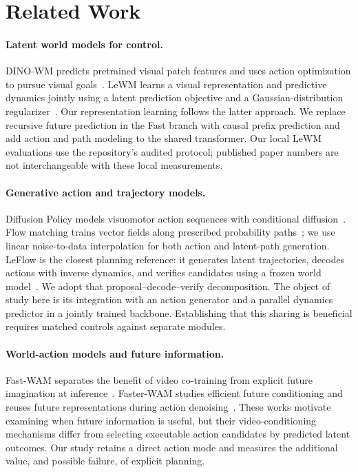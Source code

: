 \section{Related Work}
\label{sec:related}

\paragraph{Latent world models for control.}
DINO-WM predicts pretrained visual patch features and uses action optimization to pursue visual goals~\cite{zhou2024dinowm}. LeWM learns a visual representation and predictive dynamics jointly using a latent prediction objective and a Gaussian-distribution regularizer~\cite{maes2026lewm}. Our representation learning follows the latter approach. We replace recursive future prediction in the Fast branch with causal prefix prediction and add action and path modeling to the shared transformer. Our local LeWM evaluations use the repository's audited protocol; published paper numbers are not interchangeable with these local measurements.

\paragraph{Generative action and trajectory models.}
Diffusion Policy models visuomotor action sequences with conditional diffusion~\cite{chi2023diffusion}. Flow matching trains vector fields along prescribed probability paths~\cite{lipman2022flow}; we use linear noise-to-data interpolation for both action and latent-path generation. LeFlow is the closest planning reference: it generates latent trajectories, decodes actions with inverse dynamics, and verifies candidates using a frozen world model~\cite{huang2026leflow}. We adopt that proposal--decode--verify decomposition. The object of study here is its integration with an action generator and a parallel dynamics predictor in a jointly trained backbone. Establishing that this sharing is beneficial requires matched controls against separate modules.

\paragraph{World-action models and future information.}
Fast-WAM separates the benefit of video co-training from explicit future imagination at inference~\cite{yuan2026fastwam}. Faster-WAM studies efficient future conditioning and reuses future representations during action denoising~\cite{zhao2026fasterwam}. These works motivate examining when future information is useful, but their video-conditioning mechanisms differ from selecting executable action candidates by predicted latent outcomes. Our study retains a direct action mode and measures the additional value, and possible failure, of explicit planning.

